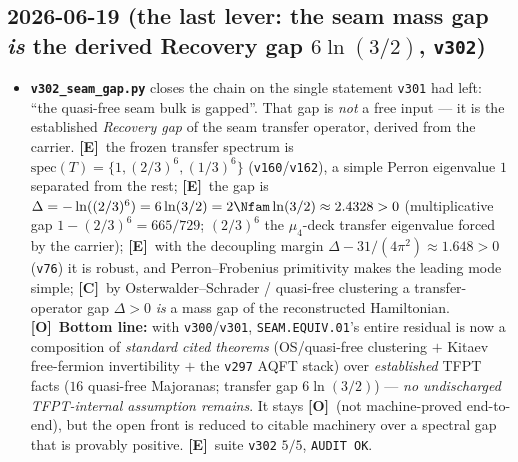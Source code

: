 \documentclass[11pt]{article}
\providecommand{\mE}{\textbf{[E]}}\providecommand{\mC}{\textbf{[C]}}
\providecommand{\mO}{\textbf{[O]}}\providecommand{\mX}{\textbf{[X]}}
\providecommand{\vref}[1]{\texttt{#1}}
\begin{document}
\subsection*{2026-06-19 (the last lever: the seam mass gap \emph{is} the derived Recovery gap $6\ln(3/2)$, \texttt{v302})}
\begin{itemize}
\item \textbf{\texttt{v302\_seam\_gap.py}} closes the chain on the single statement \vref{v301} had left:
  ``the quasi-free seam bulk is gapped''.  That gap is \emph{not} a free input --- it is the established
  \emph{Recovery gap} of the seam transfer operator, derived from the carrier.  \mE\ the frozen transfer
  spectrum is $\mathrm{spec}(T)=\{1,(2/3)^6,(1/3)^6\}$ (\vref{v160}/\vref{v162}), a simple Perron eigenvalue
  $1$ separated from the rest; \mE\ the gap is $\Delta=-\ln((2/3)^6)=6\ln(3/2)=2\Nfam\ln(3/2)\approx2.4328>0$
  (multiplicative gap $1-(2/3)^6=665/729$; $(2/3)^6$ the $\mu_4$-deck transfer eigenvalue forced by the
  carrier); \mE\ with the decoupling margin $\Delta-31/(4\pi^2)\approx1.648>0$ (\vref{v76}) it is robust, and
  Perron--Frobenius primitivity makes the leading mode simple; \mC\ by Osterwalder--Schrader / quasi-free
  clustering a transfer-operator gap $\Delta>0$ \emph{is} a mass gap of the reconstructed Hamiltonian.
  \mO\ \textbf{Bottom line:} with \vref{v300}/\vref{v301}, \texttt{SEAM.EQUIV.01}'s entire residual is now a
  composition of \emph{standard cited theorems} (OS/quasi-free clustering $+$ Kitaev free-fermion invertibility
  $+$ the \vref{v297} AQFT stack) over \emph{established} TFPT facts ($16$ quasi-free Majoranas; transfer gap
  $6\ln(3/2)$) --- \emph{no undischarged TFPT-internal assumption remains}.  It stays \mO\ (not machine-proved
  end-to-end), but the open front is reduced to citable machinery over a spectral gap that is provably positive.
  \mE\ suite \texttt{v302} $5/5$, \texttt{AUDIT OK}.
\end{itemize}
\end{document}
